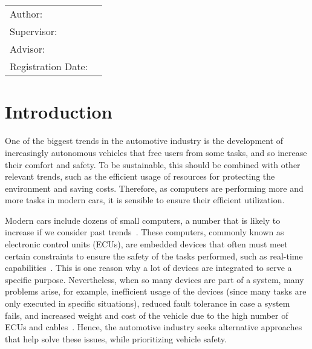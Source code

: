 
\centering

{\Large\MakeUppercase{\getFaculty{}}}\\

\vspace{5mm}
{\large\MakeUppercase{\getUniversity{}}}\\

\vspace{10mm}
{\Large \getDoctype{}}

\vspace{10mm}
{\Large\bfseries \getTitle{}}

\vspace{10mm}
{\Large\bfseries \foreignlanguage{ngerman}{\getTitleGer{}}}

\vspace{15mm}
\begin{tabular}{l l}
	Author:          & \getAuthor{} \\
	Supervisor:      & \getSupervisor{} \\
	Advisor:         & \getAdvisor{} \\
	Registration Date: & \getSubmissionDate{} \\
\end{tabular}

\vspace{20mm}


\section*{Introduction}\label{section:introduction}
One of the biggest trends in the automotive industry is the development of increasingly autonomous vehicles that free users from some tasks, and so increase their comfort and safety. To be sustainable, this should be combined with other relevant trends, such as the efficient usage of resources for protecting the environment and saving costs. Therefore, as computers are performing more and more tasks in modern cars, it is sensible to ensure their efficient utilization.

Modern cars include dozens of small computers, a number that is likely to increase if we consider past trends~\parencite{vipin1, vipin2}. These computers, commonly known as electronic control units (ECUs), are embedded devices that often must meet certain constraints to ensure the safety of the tasks performed, such as real-time capabilities~\parencite{vipin1}. This is one reason why a lot of devices are integrated to serve a specific purpose. Nevertheless, when so many devices are part of a system, many problems arise, for example, inefficient usage of the devices (since many tasks are only executed in specific situations), reduced fault tolerance in case a system fails, and increased weight and cost of the vehicle due to the high number of ECUs and cables~\parencite{vipin2}. Hence, the automotive industry seeks alternative approaches that help solve these issues, while prioritizing vehicle safety.
 
